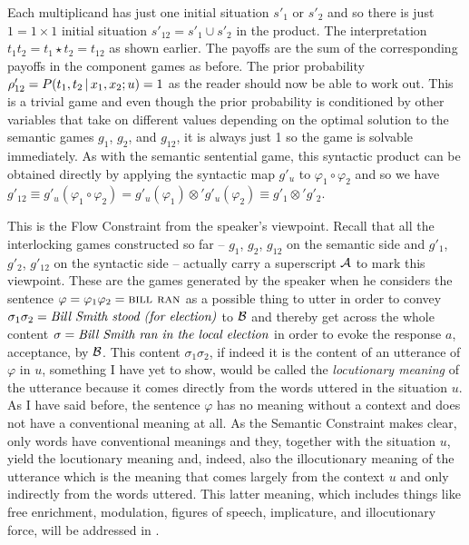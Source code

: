 Each multiplicand has just one initial situation $s'_1$ or $s'_2$ and so there is just $1 = 1 \times 1$ initial situation $s'_{12} = s'_1 \cup s'_2$ in the product. The interpretation $t_1t_2 = t_1 \star t_2 = t_{12}$ as shown earlier. The payoffs are the sum of the corresponding payoffs in the component games as before. The prior probability $\rho'_{12} = P(t_1, t_2 \,|\, x_1, x_ 2; u) = 1$ as the reader should now be able to work out. This is a trivial game and even though the prior probability is conditioned by other variables that take on different values depending on the optimal solution to the semantic games $g_1$, $g_2$, and $g_{12}$, it is always just 1 so the game is solvable immediately. As with the semantic sentential game, this syntactic product can be obtained directly by applying the syntactic map $g'_u$ to $\varphi_1 \circ \varphi_2$ and so we have $g'_{12} \equiv g'_u(\varphi_1 \circ \varphi_2) = g'_u(\varphi_1) \otimes' g'_u(\varphi_2) \equiv g'_1 \otimes' g'_2$.

This is the Flow Constraint from the speaker's viewpoint. Recall that all the interlocking games constructed so far -- $g_1$, $g_2$, $g_{12}$ on the semantic side and $g'_1$, $g'_2$, $g'_{12}$ on the syntactic side -- actually carry a superscript $\cal A$ to mark this viewpoint. These are the games generated by the speaker when he considers the sentence $\varphi = \varphi_1\varphi_2 = \Expression{Bill ran}$ as a possible thing to utter in order to convey $\sigma_1\sigma_2 = \emph{Bill Smith stood (for election)}$ to $\cal B$ and thereby get across the whole content $\sigma = \emph{Bill Smith ran in the local election}$ in order to evoke the response $a$, acceptance, by $\cal B$. This content $\sigma_1\sigma_2$, if indeed it is the content of an utterance of $\varphi$ in $u$, something I have yet to show, would be called the \emph{locutionary meaning} of the utterance because it comes directly from the words uttered in the situation $u$. As I have said before, the sentence $\varphi$ has no meaning without a context and does not have a conventional meaning at all. As the Semantic Constraint makes clear, only words have conventional meanings and they, together with the situation $u$, yield the locutionary meaning and, indeed, also the illocutionary meaning of the utterance which is the meaning that comes largely from the context $u$ and only indirectly from the words uttered. This latter meaning, which includes things like free enrichment, modulation, figures of speech, implicature, and illocutionary force, will be addressed in .

